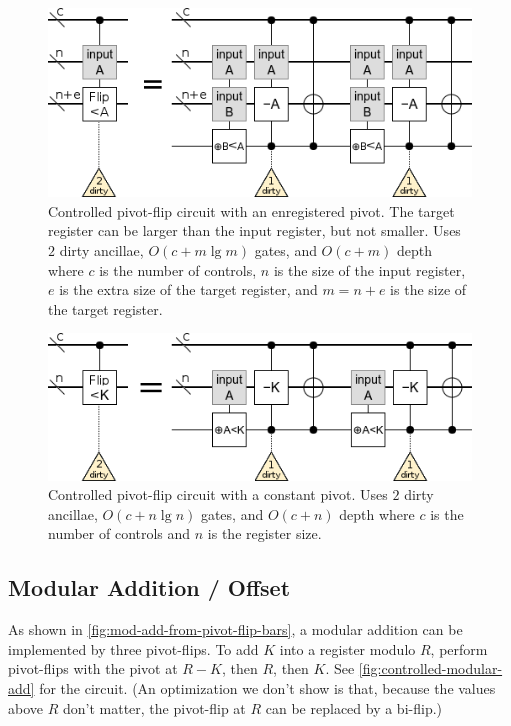 \documentclass[twocolumn,longbibliography]{quantumarticle}
\begin{document}
\begin{figure}
  \centering
  \includegraphics[width=\linewidth]{assets/controlled-pivot-flip.png}
  \caption{
    Controlled pivot-flip circuit with an enregistered pivot.
    The target register can be larger than the input register, but not smaller.
    Uses $2$ dirty ancillae, $O(c + m \lg m)$ gates, and $O(c + m)$ depth where $c$ is the number of controls, $n$ is the size of the input register, $e$ is the extra size of the target register, and $m=n+e$ is the size of the target register.
  }
  \label{fig:controlled-pivot-flip}
\end{figure}

\begin{figure}
  \centering
  \includegraphics[width=\linewidth]{assets/controlled-const-pivot-flip.png}
  \caption{
    Controlled pivot-flip circuit with a constant pivot.
    Uses $2$ dirty ancillae, $O(c + n \lg n)$ gates, and $O(c + n)$ depth where $c$ is the number of controls and $n$ is the register size.
  }
  \label{fig:controlled-const-pivot-flip}
\end{figure}


\subsection{Modular Addition / Offset}

As shown in \autoref{fig:mod-add-from-pivot-flip-bars}, a modular addition can be implemented by three pivot-flips.
To add $K$ into a register modulo $R$, perform pivot-flips with the pivot at $R-K$, then $R$, then $K$.
See \autoref{fig:controlled-modular-add} for the circuit.
(An optimization we don't show is that, because the values above $R$ don't matter, the pivot-flip at $R$ can be replaced by a bi-flip.)
\end{document}
